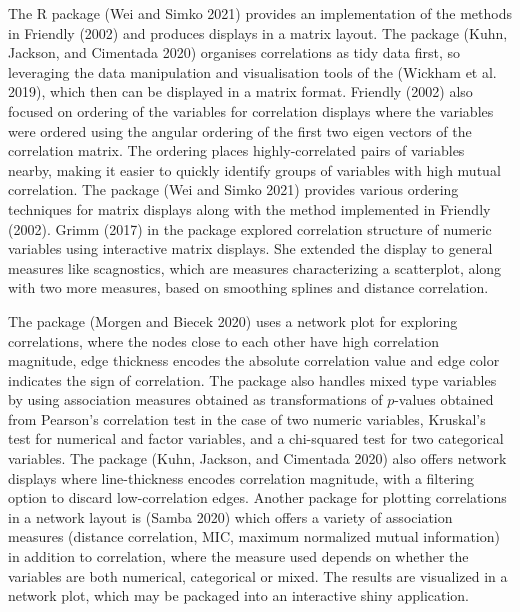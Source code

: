The R package  (Wei and Simko 2021) provides an implementation of the methods in Friendly (2002) and produces displays in a matrix layout. The package  (Kuhn, Jackson, and Cimentada 2020) organises correlations as tidy data first, so leveraging the data manipulation and visualisation tools of the  (Wickham et al. 2019), which then can be displayed in a matrix format. Friendly (2002) also focused on ordering of the variables for correlation displays where the variables were ordered using the angular ordering of the first two eigen vectors of the correlation matrix. The ordering places highly-correlated pairs of variables nearby, making it easier to quickly identify groups of variables with high mutual correlation. The package  (Wei and Simko 2021) provides various ordering techniques for matrix displays along with the method implemented in Friendly (2002). Grimm (2017) in the package  explored correlation structure of numeric variables using interactive matrix displays. She extended the display to general measures like scagnostics, which are measures characterizing a scatterplot, along with two more measures, based on smoothing splines and distance correlation.

The package  (Morgen and Biecek 2020) uses a network plot for exploring correlations, where the nodes close to each other have high correlation magnitude, edge thickness encodes the absolute correlation value and edge color indicates the sign of correlation. The package also handles mixed type variables by using association measures obtained as transformations of \(p\)-values obtained from Pearson's correlation test in the case of two numeric variables, Kruskal's test for numerical and factor variables, and a chi-squared test for two categorical variables. The package  (Kuhn, Jackson, and Cimentada 2020) also offers network displays where line-thickness encodes correlation magnitude, with a filtering option to discard low-correlation edges. Another package for plotting correlations in a network layout is  (Samba 2020) which offers a variety of association measures (distance correlation, MIC, maximum normalized mutual information) in addition to correlation, where the measure used depends on whether the variables are both numerical, categorical or mixed. The results are visualized in a network plot, which may be packaged into an interactive shiny application.

